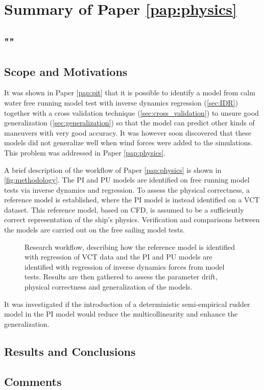 \section{Summary of Paper \ref{pap:physics}}
\subsection*{""}
\subsection*{Scope and Motivations}
It was shown in Paper \ref{pap:pit} that it is possible to identify a model from calm water free running model test with inverse dynamics regression (\autoref{sec:IDR}) together with a cross validation technique (\autoref{sec:cross_validation}) to unsure good generalization (\autoref{sec:generalization}) so that the model can predict other kinds of maneuvers with very good accuracy. It was however soon discovered that these models did not generalize well when wind forces were added to the simulations. This problem was addressed in Paper \ref{pap:physics}.

A brief description of the workflow of Paper \ref{pap:physics} is shown in \autoref{fig:methodology}.
The PI and PU models are identified on free running model tests via inverse dynamics and regression. To assess the physical correctness, a reference model is established, where the PI model is instead identified on a VCT dataset. This reference model, based on CFD, is assumed to be a sufficiently correct representation of the ship's physics.
Verification and comparisons between the models are carried out on the free sailing model tests.
\begin{figure}[h]
  \centering
  
  \caption{Research workflow, describing how the reference model is identified with regression of VCT data and the PI and PU models are identified with regression of inverse dynamics forces from model tests. Results are then gathered to assess the parameter drift, physical correctness and generalization of the models.}
  \label{fig:methodology}
\end{figure}
It was investigated if the introduction of a deterministic semi-empirical rudder model in the PI model would reduce the multicollinearity and enhance the generalization.
\subsection*{Results and Conclusions}

\subsection*{Comments}
\clearpage